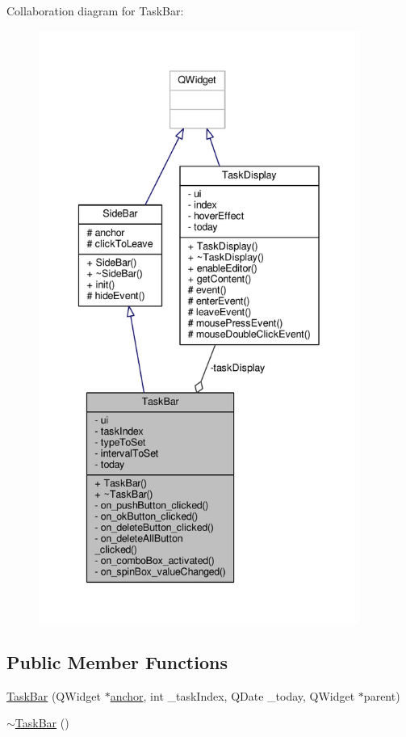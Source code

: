 Collaboration diagram for Task\+Bar\+:
\nopagebreak
\begin{figure}[H]
\begin{center}
\leavevmode
\includegraphics[height=550pt]{classTaskBar__coll__graph}
\end{center}
\end{figure}
\subsection*{Public Member Functions}
\begin{DoxyCompactItemize}
\item 
\hyperlink{classTaskBar_a62dbb456b9dd72f6e2c5f07e1765dbfe}{Task\+Bar} (Q\+Widget $\ast$\hyperlink{classSideBar_a0a6a0df257a08bdf785aeb155870efbc}{anchor}, int \+\_\+task\+Index, Q\+Date \+\_\+today, Q\+Widget $\ast$parent)
\item 
\hyperlink{classTaskBar_aba46bb3cba29968c2790a5ecfc2d3eba}{$\sim$\+Task\+Bar} ()
\end{DoxyCompactItemize}
